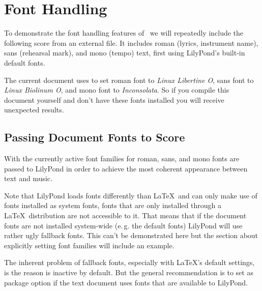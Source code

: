 \documentclass{lyluatexexample}
\begin{document}
\setmainfont{Linux Libertine O}
\setsansfont[BoldFont={Linux Biolinum O Bold}]{Linux Biolinum O}
\setmonofont{Inconsolata}

\section*{Font Handling}

To demonstrate the font handling features of \lyluatex\ we will repeatedly
include the following score from an external file.  It includes roman (lyrics,
instrument name), sans (rehearsal mark), and mono (tempo) text, first using
LilyPond's built-in default fonts.


\bigskip
The current document uses  to set roman font to \emph{Linux
Libertine O}, sans font to \emph{Linux Biolinum O}, and mono font to
\emph{Inconsolata}. So if you compile this document yourself and don't have
these fonts installed you will receive unexpected results.

\subsection*{Passing Document Fonts to Score}

With  the currently active font families for roman, sans, and
mono fonts are passed to LilyPond in order to achieve the most coherent
appearance between text and music.

\bigskip


\bigskip
Note that LilyPond loads fonts differently than \LaTeX\ and can only make use of
fonts installed as system fonts, fonts that are only installed through a \LaTeX\
distribution are not accessible to it. That means that if the document fonts are
not installed system-wide (e.\,g. the default fonts) LilyPond will use rather
ugly fallback fonts. This can't be demonstrated here but the section about
explicitly setting font families will include an example.

The inherent problem of fallback fonts, especially with \LaTeX's default
settings, is the reason  is inactive by default. But the
general recommendation is to set \option{pass-fonts} as package option if the
text document uses fonts that are available to LilyPond.
\end{document}
